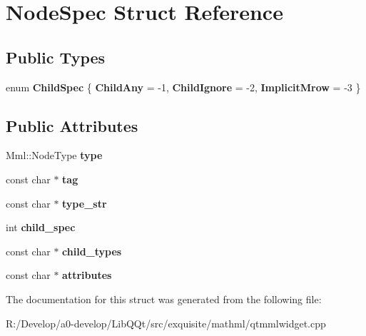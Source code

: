 \hypertarget{struct_node_spec}{}\section{Node\+Spec Struct Reference}
\label{struct_node_spec}
\subsection*{Public Types}
\begin{DoxyCompactItemize}
\item 
\mbox{\label{struct_node_spec_a35ab746e26b403d4034c11079437c470}} 
enum {\bfseries Child\+Spec} \{ {\bfseries Child\+Any} = -\/1, 
{\bfseries Child\+Ignore} = -\/2, 
{\bfseries Implicit\+Mrow} = -\/3
 \}
\end{DoxyCompactItemize}
\subsection*{Public Attributes}
\begin{DoxyCompactItemize}
\item 
\mbox{\label{struct_node_spec_ad0c81e5985b7579639db0ff576af1372}} 
Mml\+::\+Node\+Type {\bfseries type}
\item 
\mbox{\label{struct_node_spec_a39acc330c7ab5c7039173deba7ae62c2}} 
const char $\ast$ {\bfseries tag}
\item 
\mbox{\label{struct_node_spec_a5f6bbac47242dc78f680fd57285d55c2}} 
const char $\ast$ {\bfseries type\+\_\+str}
\item 
\mbox{\label{struct_node_spec_a1dc35c27805aa8c805eccbcf8d63f86b}} 
int {\bfseries child\+\_\+spec}
\item 
\mbox{\label{struct_node_spec_a74529b387c38d12a960600fe34211113}} 
const char $\ast$ {\bfseries child\+\_\+types}
\item 
\mbox{\label{struct_node_spec_a7b3a057acb85b3a8203597a2ee77d9ed}} 
const char $\ast$ {\bfseries attributes}
\end{DoxyCompactItemize}


The documentation for this struct was generated from the following file\+:\begin{DoxyCompactItemize}
\item 
R\+:/\+Develop/a0-\/develop/\+Lib\+Q\+Qt/src/exquisite/mathml/qtmmlwidget.\+cpp\end{DoxyCompactItemize}
